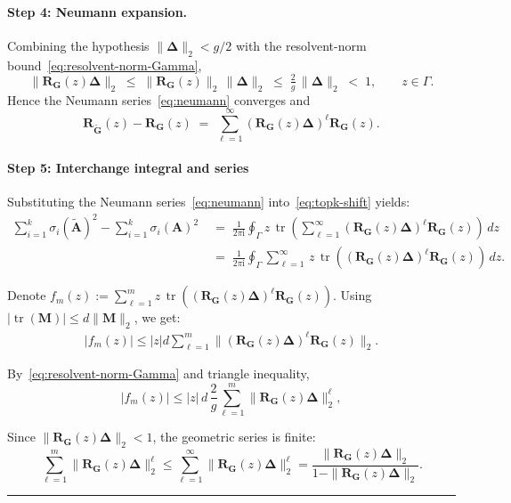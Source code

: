\documentclass{article}
\newcommand{\twonorm}[1]{\|#1\|_2}
\newcommand{\Ab}{\mathbf{A}}
\newcommand{\Gb}{\mathbf{G}}
\newcommand{\Mb}{\mathbf{M}}
\newcommand{\Rb}{\mathbf{R}}
\newcommand{\Abtil}{\tilde{\Ab}}
\newcommand{\Gbtil}{\tilde{\Gb}}
\newcommand{\BlackBox}{\rule{1.5ex}{1.5ex}}  %
\newenvironment{proof}{\par\noindent{\bf Proof\ }}{\hfill\BlackBox\par\medskip}
\newcommand{\tr}{\mathop{\mathrm{tr}}}
\newcommand{\rbr}[1]{\left(#1\right)}
\newcommand{\abr}[1]{\left|#1\right|}
\newcommand{\Deltab}{\boldsymbol{\Delta}}
\begin{document}
\begin{proof}
\paragraph{Step 4: Neumann expansion.}
Combining the hypothesis $\twonorm{\Deltab}<g/2$ with the resolvent-norm bound~\eqref{eq:resolvent-norm-Gamma},
\begin{equation}\label{eq:RGD-bound}
    \twonorm{\Rb_\Gb(z)\Deltab} \;\le\; \twonorm{\Rb_\Gb(z)}\,\twonorm{\Deltab} \;\le\; \tfrac{2}{g}\,\twonorm{\Deltab} \;<\; 1, \qquad z\in\Gamma.
\end{equation}
Hence the Neumann series~\eqref{eq:neumann} converges and
\begin{equation}\label{eq:resolvent-diff}
    \Rb_{\Gbtil}(z) - \Rb_\Gb(z) \;=\; \sum_{\ell=1}^{\infty}\rbr{\Rb_\Gb(z)\Deltab}^\ell \Rb_\Gb(z).
\end{equation}

\paragraph{Step 5: Interchange integral and series}

Substituting the Neumann series~\eqref{eq:neumann} into~\eqref{eq:topk-shift} yields:
\begin{align}
     \sum_{i=1}^{k}\sigma_i(\Abtil)^2 - \sum_{i=1}^{k}\sigma_i(\Ab)^2 \;&=\; \frac{1}{2\pi \mathrm{i}}\oint_\Gamma z\,\tr\rbr{\sum_{\ell=1}^{\infty}\rbr{\Rb_\Gb(z)\Deltab}^\ell \Rb_\Gb(z)}\,dz \\
     &= \; \frac{1}{2\pi \mathrm{i}}\oint_\Gamma \sum_{\ell=1}^{\infty} \,z\,\tr\rbr{\rbr{\Rb_\Gb(z)\Deltab}^\ell \Rb_\Gb(z)}\,dz.
\end{align}

Denote $f_m(z) := \sum_{\ell = 1}^m z\,\tr\rbr{\rbr{\Rb_\Gb(z)\Deltab}^\ell \Rb_\Gb(z)}.$ Using $\abr{\tr(\Mb)}\le d\twonorm{\Mb}$, we get:
\begin{align}
    \abr{f_m(z)} \le \abr{z}  d  \sum_{\ell = 1}^m \twonorm{\rbr{\Rb_\Gb(z)\Deltab}^\ell \Rb_\Gb(z)}.
\end{align}

By~\eqref{eq:resolvent-norm-Gamma} and triangle inequality,
\begin{equation}
    \abr{f_m(z)} \le \abr{z}\, d \, \frac{2}{g} \sum_{\ell = 1}^m \twonorm{\Rb_\Gb(z)\Deltab} ^\ell,
\end{equation}

Since $\twonorm{\Rb_\Gb(z)\Deltab} < 1$, the geometric series is finite:
\begin{equation}
    \sum_{\ell = 1}^m \twonorm{\Rb_\Gb(z)\Deltab} ^\ell \leq \sum_{\ell = 1}^\infty \twonorm{\Rb_\Gb(z)\Deltab} ^\ell = \frac{\twonorm{\Rb_\Gb(z)\Deltab}}{1-\twonorm{\Rb_\Gb(z)\Deltab}}.
\end{equation}


\end{proof}
\end{document}
